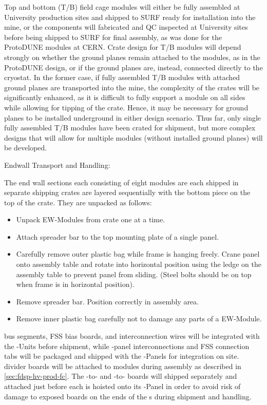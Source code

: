 Top and bottom (T/B) field cage modules will either be fully assembled at University production sites and shipped to SURF ready for installation into the mine, or the components will fabricated and QC inspected at University sites before being shipped to SURF for final assembly, as was done for the ProtoDUNE modules at CERN. Crate design for T/B modules will depend strongly on whether the ground planes remain attached to the modules, as in the ProtoDUNE design, or if the ground planes are, instead, connected directly to the cryostat. In the former case, if fully assembled T/B modules with attached ground planes are transported into the mine, the complexity of the crates will be significantly enhanced, as it is difficult to fully support a module on all sides while allowing for tipping of the crate. Hence, it may be necessary for ground planes to be installed underground in either design scenario. Thus far, only single fully assembled T/B modules have been crated for shipment, but more complex designs that will allow for multiple modules (without installed ground planes) will be developed.

Endwall Transport and Handling:

The end wall sections each consisting of eight modules are each shipped in separate shipping crates are layered sequentially with the bottom piece on the top of the crate.  They are unpacked as follows:

\begin{itemize}
\item Unpack  EW-Modules from crate one at a time. 
\item Attach spreader bar to the  top mounting plate of a single panel.
\item Carefully remove outer plastic bag while frame is hanging freely.
Crane panel onto assembly table and rotate into horizontal position using the ledge on the assembly table to prevent panel from sliding. 
(Steel bolts should be on top when frame is in horizontal position).
\item Remove spreader bar. Position correctly in assembly area.
\item Remove inner plastic bag carefully not to damage any parts of a  EW-Module.
\end{itemize}

 bus segments, FSS bias boards, and  interconnection wires will be integrated with the -Units before shipment, while -panel interconnections and FSS connection tabs will be packaged and shipped with the -Panels for integration on site.
 divider boards will be attached to  modules during  assembly as described in \ref{sec:fdsp-hv-prod-fc}.
The -to- and -to- boards will shipped separately and attached just before each  is hoisted onto its -Panel in order to avoid risk of damage to exposed boards on the ends of the s during shipment and handling.


